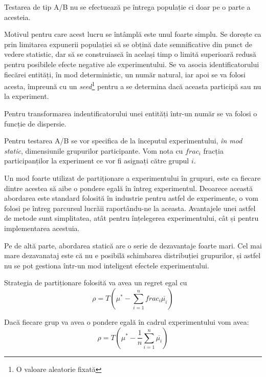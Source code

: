 \begin{remark}
	Testarea de tip A/B nu se efectuează pe întrega populație ci doar pe o parte a acesteia.
\end{remark}

Motivul pentru care acest lucru se întâmplă este unul foarte simplu. Se dorește ca prin limitarea expunerii populației să se obțină date semnificative din punct de vedere statistic, dar să se construiască în același timp o limită superioară redusă pentru posibilele efecte negative ale experimentului. Se va asocia identificatorului fiecărei entități, în mod deterministic, un număr natural, iar apoi se va folosi acesta, împreună cu un \textit{seed}\footnote{O valoare aleatorie fixată} pentru a se determina dacă aceasta participă sau nu la experiment.

\begin{remark}
	Pentru transformarea indentificatorului unei entități într-un număr se va folosi o funcție de dispersie.
\end{remark}

Pentru testarea A/B se vor specifica de la începutul experimentului, \textit{în mod static}, dimensiunile grupurilor participante. Vom nota cu $frac_{i}$ fracția participanților la experiment ce vor fi asignați către grupul $i$.

 Un mod foarte utilizat de partiționare a experimentului în grupuri, este ca fiecare dintre acestea să aibe o pondere egală în întreg experimentul. Deoarece această abordarea este standard folosită în industrie pentru astfel de experimente, o vom folosi pe întreg parcursul lucrăii raportându-ne la aceasta. Avantajele unei astfel de metode sunt simplitatea, atât pentru înțelegerea experimentului, cât și pentru implementarea acestuia.

Pe de altă parte, abordarea statică are o serie de dezavantaje foarte mari. Cel mai mare dezavanataj este că nu e posibilă schimbarea distribuției grupurilor, și astfel nu se pot gestiona într-un mod inteligent efectele experimentului. 

\begin{remark}
	Strategia de partiționare folosită va avea un regret egal cu
	\[
	\rho = T ( \mu^*  - \sum_{i = 1}^{n} frac_{i} \overline{\mu_i})
	\]
\end{remark}

\begin{remark}
	Dacă fiecare grup va avea o pondere egală în cadrul experimentului vom avea:
	\[
	\rho = T ( \mu^*  - \frac{1}{n} \sum_{i = 1}^{n}\overline{\mu_i})
	\]
\end{remark}

